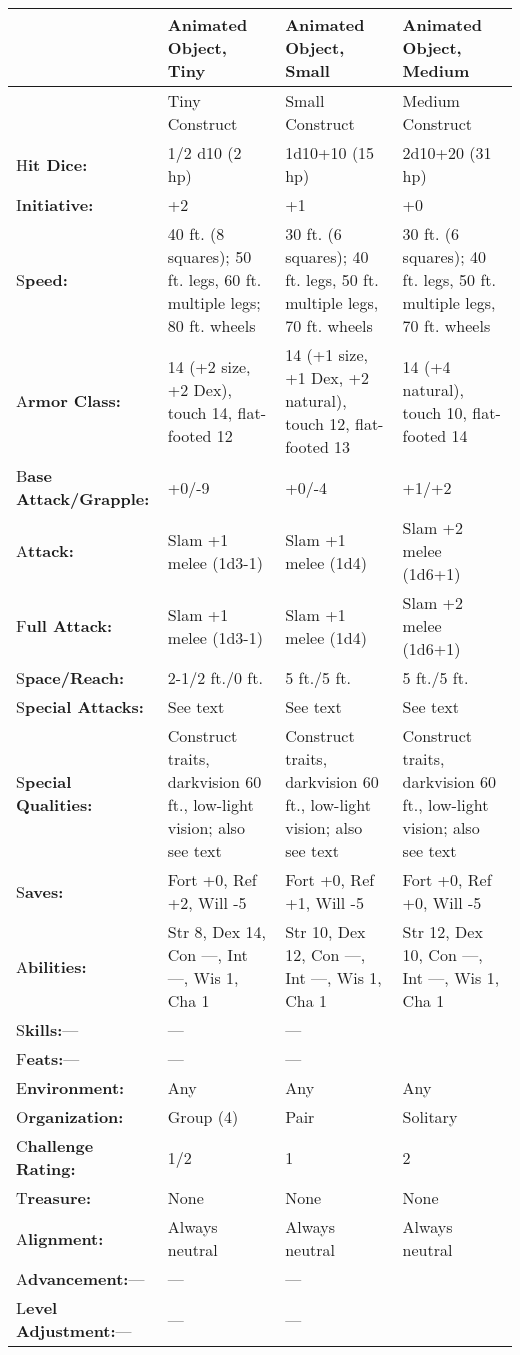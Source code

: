 \documentclass{article}
\begin{document}
\begin{tabular}{|>{\raggedright}p{52pt}|>{\raggedright}p{83pt}|>{\raggedright}p{83pt}|>{\raggedright}p{83pt}|}
\hline
 & A\textbf{nimated Object, Tiny} & A\textbf{nimated Object, Small} & A\textbf{nimated 
Object, Medium}\tabularnewline
\hline
  & Tiny Construct & Small Construct & Medium Construct\tabularnewline
\hline
H\textbf{it Dice:} & 1/2 d10 (2 hp) & 1d10+10 (15 hp) & 2d10+20 (31 hp)\tabularnewline
\hline
I\textbf{nitiative:} & +2 & +1 & +0\tabularnewline
\hline
S\textbf{peed:} & 40 ft. (8 squares); 50 ft. legs, 60 ft. multiple legs; 80 ft. 
wheels & 30 ft. (6 squares); 40 ft. legs, 50 ft. multiple legs, 70 ft. wheels & 30 
ft. (6 squares); 40 ft. legs, 50 ft. multiple legs, 70 ft. wheels\tabularnewline
\hline
A\textbf{rmor Class:} & 14 (+2 size, +2 Dex), touch 14, flat-footed 12 & 14 (+1 
size, +1 Dex, +2 natural), touch 12, flat-footed 13 & 14 (+4 natural), touch 10, 
flat-footed 14\tabularnewline
\hline
B\textbf{ase Attack/Grapple:} & +0/-9 & +0/-4 & +1/+2\tabularnewline
\hline
A\textbf{ttack:} & Slam +1 melee (1d3-1) & Slam +1 melee (1d4) & Slam +2 melee 
(1d6+1)\tabularnewline
\hline
F\textbf{ull Attack:} & Slam +1 melee (1d3-1) & Slam +1 melee (1d4) & Slam +2 melee 
(1d6+1)\tabularnewline
\hline
S\textbf{pace/Reach:} & 2-1/2 ft./0 ft. & 5 ft./5 ft. & 5 ft./5 ft.\tabularnewline
\hline
S\textbf{pecial Attacks:} & See text & See text & See text\tabularnewline
\hline
S\textbf{pecial Qualities:} & Construct traits, darkvision 60 ft., low-light vision; 
also see text & Construct traits, darkvision 60 ft., low-light vision; also see 
text & Construct traits, darkvision 60 ft., low-light vision; also see text\tabularnewline
\hline
S\textbf{aves:} & Fort +0, Ref +2, Will -5 & Fort +0, Ref +1, Will -5 & Fort +0, 
Ref +0, Will -5\tabularnewline
\hline
A\textbf{bilities:} & Str 8, Dex 14, Con ---, Int ---, Wis 1, Cha 1 & Str 10, Dex 
12, Con ---, Int ---, Wis 1, Cha 1 & Str 12, Dex 10, Con ---, Int ---, Wis 1, Cha 
1\tabularnewline
\hline
S\textbf{kills:}--- & --- & --- & \tabularnewline
\hline
F\textbf{eats:}--- & --- & --- & \tabularnewline
\hline
E\textbf{nvironment:} & Any & Any & Any\tabularnewline
\hline
O\textbf{rganization:} & Group (4) & Pair & Solitary\tabularnewline
\hline
C\textbf{hallenge Rating:} & 1/2 & 1 & 2\tabularnewline
\hline
T\textbf{reasure:} & None & None & None\tabularnewline
\hline
A\textbf{lignment:} & Always neutral & Always neutral & Always neutral\tabularnewline
\hline
A\textbf{dvancement:}--- & --- & --- & \tabularnewline
\hline
L\textbf{evel Adjustment:}--- & --- & --- & \tabularnewline
\hline
\end{tabular}
\end{document}
